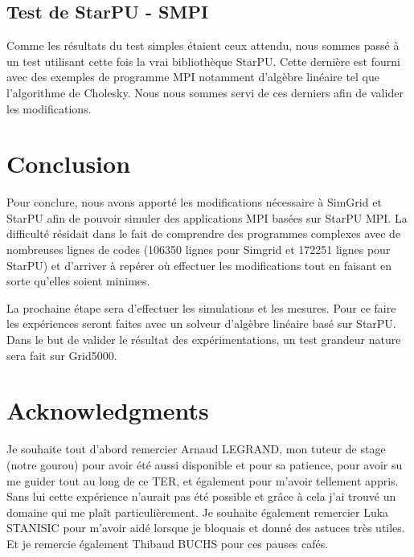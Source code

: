 \documentclass[smallextended]{svjour3}
\begin{document}
\subsection{Test de StarPU - SMPI}
\label{sec-6-2}
Comme les résultats du test simples étaient ceux attendu, nous
sommes passé à un test utilisant cette fois la vrai bibliothèque
StarPU. Cette dernière est fourni avec des exemples de programme MPI
notamment d'algèbre linéaire tel que l'algorithme de Cholesky. Nous
nous sommes servi de ces derniers afin de valider les
modifications. 
\section{Conclusion}
\label{sec-7}
Pour conclure, nous avons apporté les modifications nécessaire à 
SimGrid et StarPU afin de pouvoir simuler des applications MPI basées 
sur StarPU MPI. La difficulté résidait dans le fait de comprendre des 
programmes complexes avec de nombreuses lignes de codes (106350 lignes 
pour Simgrid et 172251 lignes pour StarPU) et d'arriver à repérer où 
effectuer les modifications tout en faisant en sorte qu'elles soient 
minimes.

La prochaine étape sera d'effectuer les simulations et les mesures. 
Pour ce faire les expériences seront faites avec un solveur d'algèbre 
linéaire basé sur StarPU. Dans le but de valider le résultat des 
expérimentations, un test grandeur nature sera fait sur Grid5000.  

\section*{Acknowledgments}
Je souhaite tout d'abord remercier Arnaud LEGRAND, mon tuteur de stage
(notre gourou) pour avoir été aussi disponible et pour sa patience, pour
avoir su me guider tout au long de ce TER, et également pour m'avoir
tellement appris. Sans lui cette expérience n'aurait pas été possible
et grâce à cela j'ai trouvé un domaine qui me plaît particulièrement.
Je souhaite également remercier Luka STANISIC pour m'avoir aidé
lorsque je bloquais et donné des astuces très utiles.
Et je remercie également Thibaud BUCHS pour ces pauses cafés.
\nocite{*}
\def\raggedright{}


\end{document}
